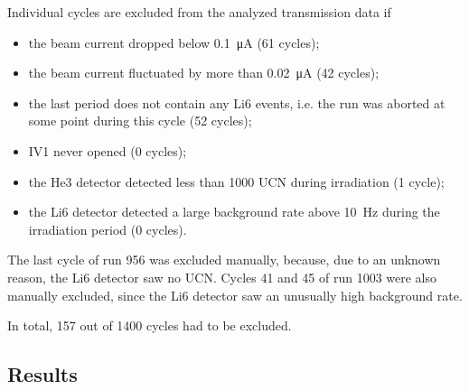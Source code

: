 \documentclass[10pt,letterpaper]{article}
\begin{document}
Individual cycles are excluded from the analyzed transmission data if
\begin{itemize}
\item the beam current dropped below \SI{0.1}{\micro\ampere} (61 cycles);
\item the beam current fluctuated by more than \SI{0.02}{\micro\ampere} (42 cycles);
\item the last period does not contain any Li6 events, i.e. the run was aborted at some point during this cycle (52 cycles);
\item IV1 never opened (0 cycles);
\item the He3 detector detected less than 1000 UCN during irradiation (1 cycle);
\item the Li6 detector detected a large background rate above \SI{10}{\hertz} during the irradiation period (0 cycles).
\end{itemize}
The last cycle of run 956 was excluded manually, because, due to an unknown reason, the Li6 detector saw no UCN. Cycles 41 and 45 of run 1003 were also manually excluded, since the Li6 detector saw an unusually high background rate.

In total, 157 out of 1400 cycles had to be excluded.

\subsection{Results}
\end{document}
